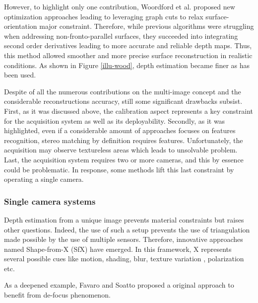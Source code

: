 However, to highlight only one contribution, Woordford et al. \cite{Woodford2008GlobalPriors} proposed new optimization approaches leading to leveraging graph cuts to relax surface-orientation major constraint. Therefore, while previous algorithms were struggling when addressing non-fronto-parallel surfaces, they succeeded into integrating second order derivatives leading to more accurate and reliable depth maps. Thus, this method allowed smoother and more precise surface reconstruction in realistic conditions. As shown in Figure \ref{illu-wood}, depth estimation became finer as \cite{Woodford2008GlobalPriors} has been used.

Despite of all the numerous contributions on the multi-image concept and the considerable reconstructions accuracy, still some significant drawbacks subsist. First, as it was discussed above, the calibration aspect represents a key constraint for the acquisition system as well as its deployability. Secondly, as it was highlighted, even if a considerable amount of approaches focuses on features recognition, stereo matching by definition requires features. Unfortunately, the acquisition may observe textureless areas which leads to unsolvable problem. 
Last, the acquisition system requires two or more cameras, and this by essence could be problematic. In response, some methods lift this last constraint by operating a single camera.

\subsubsection{Single camera systems}\label{scs}

Depth estimation from a unique image prevents material constraints but raises other questions. Indeed, the use of such a setup prevents the use of triangulation made possible by the use of multiple sensors.
Therefore, innovative approaches named Shape-from-X (SfX) have emerged. In this framework, X represents several possible cues like motion\cite{caine1993design,dellaert2000structure,chhatkuli2014non,parashar2016isometric}, shading\cite{horn1986variational,zhang1999shape}, blur\cite{favaro2005geometric,zhuo2009recovery}, texture variation \cite{aloimonos1988shape}, polarization \cite{morel2006active,stolz2012shape} etc.

As a deepened example, Favaro and Soatto \cite{favaro2005geometric} proposed a original approach to benefit from de-focus phenomenon. 


